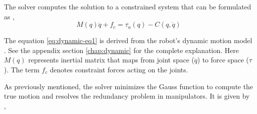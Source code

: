  
 The solver computes the solution to a constrained system that can be formulated as \cite{shakhimardanov2015composable}, 
 \begin{equation}\label{eq:dynamic-eq1}
		 M(q)\ddot{q} + f_c = \tau_a(q) - C(q, \dot{q})
 \end{equation}
 
 
 The equation \ref{eq:dynamic-eq1} is derived from the robot's dynamic motion model \cite{shakhimardanov2015composable}. See the appendix section \autoref{chap:dynamic} for the complete explanation.
 Here $M(q)$ represents inertial matrix that maps from joint space ($\ddot{q}$) to force space ($\tau$). The term  $f_c$ denotes constraint forces acting on the joints.
 
As previously mentioned, the solver minimizes the Gauss function to compute the true motion and resolves the redundancy problem in manipulators. It is given by \cite{vereshchagin1989modeling}, 

